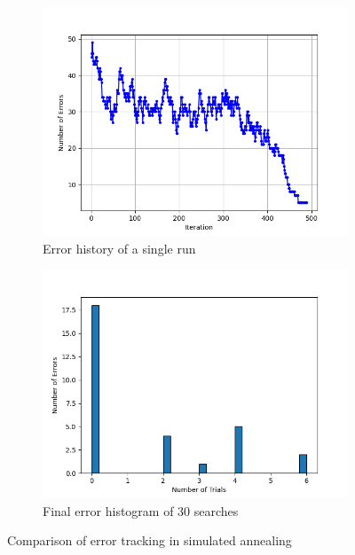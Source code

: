 \documentclass[11pt]{article}
\begin{document}
\begin{figure}[H]
\centering
\begin{subfigure}{0.48\textwidth}
  \centering
  \includegraphics[width=\textwidth]{images/Figure_1.png}
  \caption{Error history of a single run}
  \label{fig:error_history}
\end{subfigure}
\hfill
\begin{subfigure}{0.48\textwidth}
  \centering
  \includegraphics[width=\textwidth]{images/Figure_2.png}
  \caption{Final error histogram of 30 searches}
  \label{fig:error_histogram}
\end{subfigure}

\caption{Comparison of error tracking in simulated annealing}
\vspace{1em}
\label{fig:comparison}
\end{figure}
\end{document}

